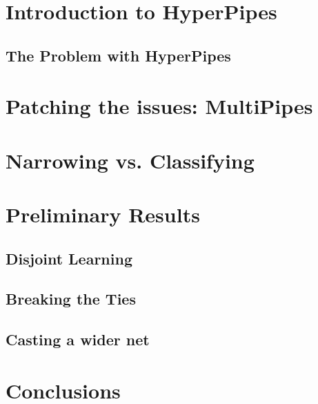 \documentclass{acm_proc_article-sp}
\begin{document}
\section{Introduction to HyperPipes}





\subsection{The Problem with HyperPipes}



\section{Patching the issues: MultiPipes}



\section{Narrowing vs. Classifying}



\section{Preliminary Results}

\subsection{Disjoint Learning}



\subsection{Breaking the Ties}





\subsection{Casting a wider net}



\section{Conclusions}





\balancecolumns
\end{document}
